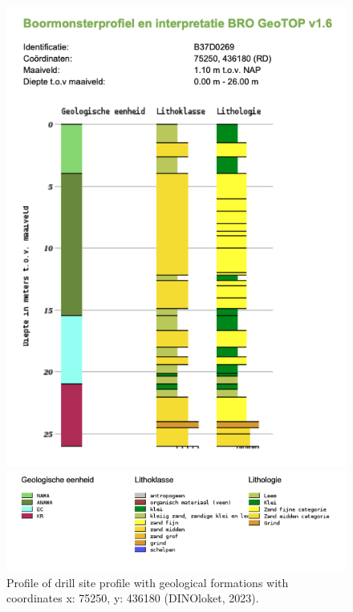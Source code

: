 \begin{figure}[h]
    \centering
    \begin{minipage}{0.30\linewidth}
        \includegraphics[width=\linewidth]{figures/roz/boor.png}
        \caption{Profile of drill site profile with geological formations with coordinates x: 75250, y: 436180 (DINOloket, 2023).}
        \label{georoz}
    \end{minipage}
    \hfill
    \begin{minipage}{0.60\linewidth}
        \includegraphics[width=\linewidth]{figures/roz/litho.png}
    \end{minipage}
\end{figure}\\
